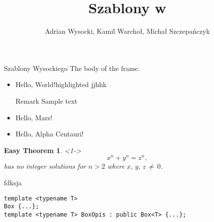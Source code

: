 \documentclass[11pt]{beamer}
\title{Szablony w \cpp}
\author[]{Adrian Wysocki, Kamil Warchoł, Michał Szczepańczyk}
\begin{document}
\begin{frame}
\titlepage
\end{frame}
\author{}
\begin{frame}{Szablony Wysockiego}
The body of the frame.
\end{frame}

\begin{frame}
    \begin{itemize}
    \item Hello, World!\alert{highlighted} jjhhk
    \begin{block}{Remark}
Sample text
\end{block}
    \item Hello, Mars!
    \item Hello, Alpha Centauri!
    \end{itemize}
    \newtheorem{thm}{Easy Theorem}
    \begin{thm}<1->
$$x^n+y^n=z^n,$$
has no integer solutions for $n>2$
where $x,\,y,\,z\,\neq\,0$.
\end{thm}
\end{frame}

\begin{frame}[fragile]{fdksja}

\begin{lstlisting}[frame=single]  % Start your code-block
template <typename T>
Box {...};
template <typename T> BoxOpis : public Box<T> {...};
\end{lstlisting}

\end{frame}
\end{document}
